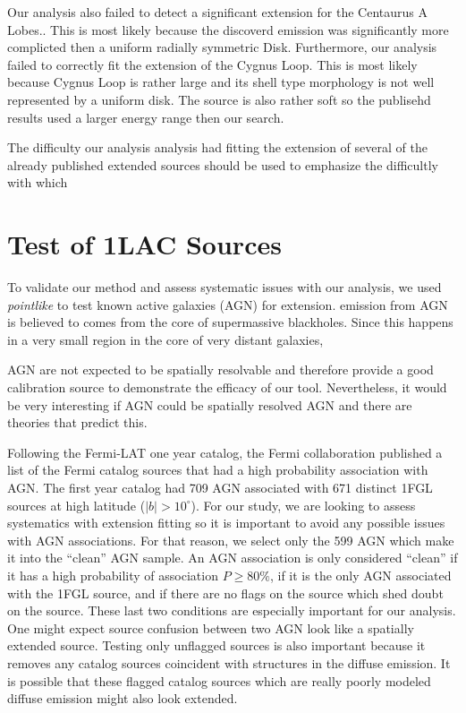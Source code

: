 \documentclass[preprint]{aastex}
\newcommand{\gev}{\text{GeV}\xspace}
\newcommand{\pointlike}{{\em pointlike}\xspace}
\begin{document}
Our analysis also failed to detect a significant extension for the
Centaurus A Lobes.\cite{CenA paper}. This is most likely because the
discoverd emission was significantly more complicted then a uniform
radially symmetric Disk.  Furthermore, our analysis failed to correctly
fit the extension of the Cygnus Loop\cite{Cygnus Loop Paper}.  This is
most likely because Cygnus Loop is rather large and its shell type
morphology is not well represented by a uniform disk. The source is
also rather soft so the publisehd results used a larger energy range
then our search.


The difficulty our analysis analysis had fitting the extension of several
of the already published extended sources should be used to emphasize
the difficultly with which

\section{Test of 1LAC Sources}

To validate our method and assess systematic issues with our
analysis, we used \pointlike to test known active galaxies (AGN) for extension.
\gev emission from AGN is believed to comes from the
core of supermassive blackholes. Since this happens in a very small region
in the core of very distant galaxies,

AGN are not expected to be spatially resolvable and therefore
provide a good calibration source to demonstrate the efficacy of our
tool. Nevertheless, it would be very interesting if AGN could be
spatially resolved AGN and there are theories that predict
this\cite{pair_halo_paper, http://adsabs.harvard.edu/doi/10.1086/187222}.

Following the Fermi-LAT one year catalog, the Fermi collaboration
published a list of the Fermi catalog sources that had a high probability
association with AGN. The first year catalog had 709 AGN associated with
671 distinct 1FGL sources at high latitude ($|b|>10^\circ$).  For our
study, we are looking to assess systematics with extension fitting so
it is important to avoid any possible issues with AGN associations.
For that reason, we select only the 599 AGN which make it into the
``clean'' AGN sample. An AGN association is only considered ``clean''
if it has a high probability of association $P\ge 80\%$, if it is the
only AGN associated with the 1FGL source, and if there are no flags
on the source which shed doubt on the source\cite{1FGL}. These last two
conditions are especially important for our analysis. One might expect
source confusion between two AGN look like a spatially extended source.
Testing only unflagged sources is also important because it removes
any catalog sources coincident with structures in the diffuse emission.
It is possible that these flagged catalog sources which are really poorly
modeled diffuse emission might also look extended.
\end{document}
